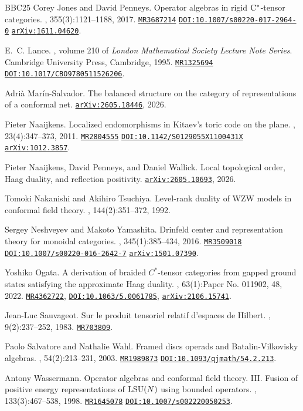 \documentclass[11pt,reqno]{amsart}
\newcommand{\arxiv}[1]{\href{http://arxiv.org/abs/#1}{\tt arXiv:\nolinkurl{#1}}}
\newcommand{\mathscinet}[1]{\href{http://www.ams.org/mathscinet-getitem?mr=#1}{\tt #1}}
\newcommand{\doi}[1]{\href{http://dx.doi.org/#1}{{\tt DOI:#1}}}
\numberwithin{equation}{section}
\theoremstyle{plain}
\theoremstyle{definition}
\begin{document}
\begin{thebibliography}{BBC{\etalchar{+}}25}
Corey Jones and David Penneys.
\newblock Operator algebras in rigid {$\rm C^*$}-tensor categories.
, 355(3):1121--1188, 2017.
\newblock \mathscinet{MR3687214} \doi{10.1007/s00220-017-2964-0} \arxiv{1611.04620}.

E.~C. Lance.
, volume 210 of {\em London Mathematical Society Lecture Note Series}.
\newblock Cambridge University Press, Cambridge, 1995.
\newblock \mathscinet{MR1325694} \doi{10.1017/CBO9780511526206}.

Adri\`a Mar\'in-Salvador.
\newblock The balanced structure on the category of representations of a conformal net.
\newblock \arxiv{2605.18446}, 2026.

Pieter Naaijkens.
\newblock Localized endomorphisms in {K}itaev's toric code on the plane.
, 23(4):347--373, 2011.
\newblock \mathscinet{MR2804555} \doi{10.1142/S0129055X1100431X} \arxiv{1012.3857}.

Pieter Naaijkens, David Penneys, and Daniel Wallick.
\newblock Local topological order, {H}aag duality, and reflection positivity.
\newblock \arxiv{2605.10693}, 2026.

Tomoki Nakanishi and Akihiro Tsuchiya.
\newblock Level-rank duality of {WZW} models in conformal field theory.
, 144(2):351--372, 1992.

Sergey Neshveyev and Makoto Yamashita.
\newblock Drinfeld center and representation theory for monoidal categories.
, 345(1):385--434, 2016.
\newblock \mathscinet{MR3509018} \doi{10.1007/s00220-016-2642-7} \arxiv{1501.07390}.

Yoshiko Ogata.
\newblock A derivation of braided {$C^*$}-tensor categories from gapped ground states satisfying the approximate {H}aag duality.
, 63(1):Paper No. 011902, 48, 2022.
\newblock \mathscinet{MR4362722}, \doi{10.1063/5.0061785}, \arxiv{2106.15741}.

Jean-Luc Sauvageot.
\newblock Sur le produit tensoriel relatif d'espaces de {H}ilbert.
, 9(2):237--252, 1983.
\newblock \mathscinet{MR703809}.

Paolo Salvatore and Nathalie Wahl.
\newblock Framed discs operads and {B}atalin-{V}ilkovisky algebras.
, 54(2):213--231, 2003.
\newblock \mathscinet{MR1989873} \doi{10.1093/qjmath/54.2.213}.

Antony Wassermann.
\newblock Operator algebras and conformal field theory. {III}. {F}usion of positive energy representations of {${\rm LSU}(N)$} using bounded operators.
, 133(3):467--538, 1998.
\newblock \mathscinet{MR1645078} \doi{10.1007/s002220050253}.

\end{thebibliography}
\end{document}
